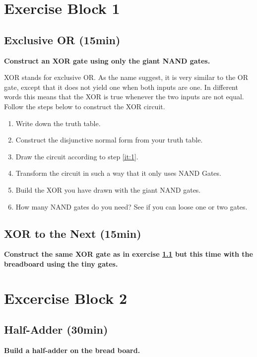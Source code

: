 \newpage
\section{Exercise Block 1}

\subsection{Exclusive OR (15min)}\label{subsec:ex-1}
\textbf{Construct an XOR gate using only the giant NAND gates.}

 XOR stands for exclusive OR. As the name suggest, it is very similar to the OR gate, except that it does not yield one when both inputs are one. In different words this means that the XOR is true whenever the two inputs are not equal. Follow the steps below to construct the XOR circuit.
\begin{enumerate}
	\item Write down the truth table.
	\item\label{it:1} Construct the disjunctive normal form from your truth table.
	\item Draw the circuit according to step \ref{it:1}.
	\item Transform the circuit in such a way that it only uses NAND Gates.
	\item Build the XOR you have drawn with the giant NAND gates.
	\item How many NAND gates do you need? See if you can loose one or two gates.
\end{enumerate}

\subsection{XOR to the Next (15min)}
\textbf{Construct the same XOR gate as in exercise \ref{subsec:ex-1} but this time with the breadboard using the tiny gates.}


\section{Excercise Block 2}

\subsection{Half-Adder (30min)}
\textbf{Build a half-adder on the bread board.}

